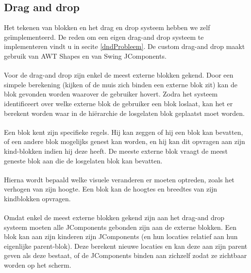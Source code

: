 \documentclass[]{article}
\begin{document}
\subsection{Drag and drop}
\label{dnd}
Het tekenen van blokken en het drag en drop systeem hebben we zelf ge\"implementeerd. De reden om een eigen drag-and drop systeem te implementeren vindt u in secite \ref{dndProbleem}. De custom drag-and drop maakt gebruik van AWT Shapes en van Swing JComponents. \\\\
Voor de drag-and drop zijn enkel de meest externe blokken gekend. Door een simpele berekening (kijken of de muis zich binden een externe blok zit) kan de blok gevonden worden waarover de gebruiker hovert. Zodra het systeem identificeert over welke externe blok de gebruiker een blok loslaat, kan het er berekent worden waar in de hi\"erarchie de losgelaten blok geplaatst moet worden. \\\\
Een blok kent zijn specifieke regels. Hij kan zeggen of hij een blok kan bevatten, of een andere blok mogelijks genest kan worden, en hij kan dit opvragen aan zijn kind-blokken indien hij deze heeft. De meeste externe blok vraagt de meest geneste blok aan die de losgelaten blok kan bevatten. \\\\
Hierna wordt bepaald welke visuele veranderen er moeten optreden, zoals het verhogen van zijn hoogte. Een blok kan de hoogtes en breedtes van zijn kindblokken opvragen. \\\\
Omdat enkel de meest externe blokken gekend zijn aan het drag-and drop systeem moeten alle JComponents gebonden zijn aan de externe blokken. Een blok kan aan zijn kinderen zijn JComponents (en hun locaties relatief aan hun eigenlijke parent-blok). Deze berekent nieuwe locaties en kan deze aan zijn parent geven als deze bestaat, of de JComponents binden aan zichzelf zodat ze zichtbaar worden op het scherm.
\end{document}
